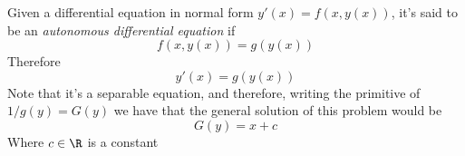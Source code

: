 \documentclass[../mmf.tex]{subfiles}
\begin{document}
\begin{dfn}
	Given a differential equation in normal form $y'(x)=f(x,y(x))$, it's said to be an \textit{autonomous differential equation} if
	\begin{equation*}
		f(x,y(x))=g(y(x))
	\end{equation*}
	Therefore
	\begin{equation}
		y'(x)=g(y(x))
		\label{eq:autonomousode}
	\end{equation}
	Note that it's a separable equation, and therefore, writing the primitive of $1/g(y)=G(y)$ we have that the general solution of this problem would be
	\begin{equation*}
		G(y)=x+c
	\end{equation*}
	Where $c\in\R$ is a constant
\end{dfn}
\end{document}
